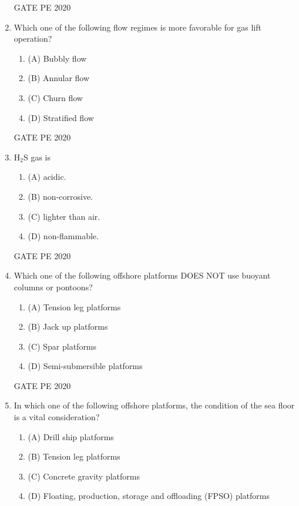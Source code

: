 \documentclass[journal,12pt,onecolumn]{IEEEtran}
\theoremstyle{remark}
\begin{document}
\begin{enumerate}
  \hfill{GATE PE 2020}
 
\item Which one of the following flow regimes is more favorable for gas lift operation?

\begin{multicols}{2}
\begin{enumerate}
\item (A) Bubbly flow
\item (B) Annular flow
\item (C) Churn flow
\item (D) Stratified flow
\end{enumerate}
\end{multicols}


  \hfill{GATE PE 2020}

\item H$_2$S gas is

\begin{multicols}{2}
\begin{enumerate}
\item (A) acidic.
\item (B) non-corrosive.
\item (C) lighter than air.
\item (D) non-flammable.
\end{enumerate}
\end{multicols}


  \hfill{GATE PE 2020}

\item Which one of the following offshore platforms DOES NOT use buoyant columns or pontoons?

\begin{multicols}{2}
\begin{enumerate}
\item (A) Tension leg platforms
\item (B) Jack up platforms
\item (C) Spar platforms
\item (D) Semi-submersible platforms
\end{enumerate}
\end{multicols}


  \hfill{GATE PE 2020}
 
\item In which one of the following offshore platforms, the condition of the sea floor is a vital consideration?

\begin{multicols}{2}
\begin{enumerate}
\item (A) Drill ship platforms
\item (B) Tension leg platforms
\item (C) Concrete gravity platforms
\item (D) Floating, production, storage and offloading (FPSO) platforms
\end{enumerate}
\end{multicols}


\end{enumerate}
\end{document}
